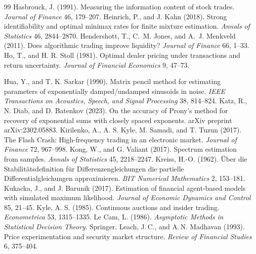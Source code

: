 \documentclass[12pt]{article}
\theoremstyle{definition}
\theoremstyle{remark}
\begin{document}
\begin{thebibliography}{99}
 Hasbrouck, J. (1991). Measuring the information content of stock trades. \emph{Journal of Finance} 46, 179--207.
 Heinrich, P., and J. Kahn (2018). Strong identifiability and optimal minimax rates for finite mixture estimation. \emph{Annals of Statistics} 46, 2844--2870.
 Hendershott, T., C.~M. Jones, and A.~J. Menkveld (2011). Does algorithmic trading improve liquidity? \emph{Journal of Finance} 66, 1--33.
 Ho, T., and H. R. Stoll (1981). Optimal dealer pricing under transactions and return uncertainty. \emph{Journal of Financial Economics} 9, 47--73.

 Hua, Y., and T. K. Sarkar (1990). Matrix pencil method for estimating parameters of exponentially damped/undamped sinusoids in noise. \emph{IEEE Transactions on Acoustics, Speech, and Signal Processing} 38, 814--824.
 Katz, R., N. Diab, and D. Batenkov (2023). On the accuracy of Prony's method for recovery of exponential sums with closely spaced exponents. arXiv preprint arXiv:2302.05883.
 Kirilenko, A., A. S. Kyle, M. Samadi, and T. Tuzun (2017). The Flash Crash: High-frequency trading in an electronic market. \emph{Journal of Finance} 72, 967--998.
 Kong, W., and G. Valiant (2017). Spectrum estimation from samples. \emph{Annals of Statistics} 45, 2218--2247.
 Kreiss, H.-O. (1962). \"Uber die Stabilit\"atsdefinition f\"ur Differenzengleichungen die partielle Differentialgleichungen approximieren. \emph{BIT Numerical Mathematics} 2, 153--181.
 Kukacka, J., and J. Barunik (2017). Estimation of financial agent-based models with simulated maximum likelihood. \emph{Journal of Economic Dynamics and Control} 85, 21--45.
 Kyle, A. S. (1985). Continuous auctions and insider trading. \emph{Econometrica} 53, 1315--1335.
 Le Cam, L. (1986). \emph{Asymptotic Methods in Statistical Decision Theory}. Springer.
 Leach, J.\,C., and A.\,N. Madhavan (1993). Price experimentation and security market structure. \emph{Review of Financial Studies} 6, 375--404.


\end{thebibliography}
\end{document}
